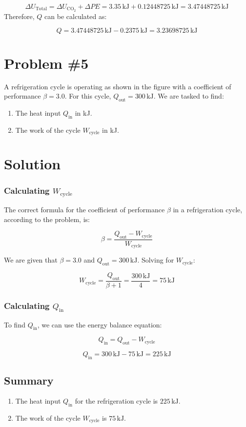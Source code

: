 \documentclass[12pt]{article}
\begin{document}
\[
\Delta U_{\text{Total}} = \Delta U_{\text{CO}_2} + \Delta PE = 3.35 \, \text{kJ} + 0.12448725 \, \text{kJ} = 3.47448725 \, \text{kJ}
\]
Therefore, \(Q\) can be calculated as:

\[
Q = 3.47448725 \, \text{kJ} - 0.2375 \, \text{kJ} = 3.23698725 \, \text{kJ}
\]
\newpage
\section*{Problem \#5}
A refrigeration cycle is operating as shown in the figure with a coefficient of performance \(\beta = 3.0\). For this cycle, \(Q_{\text{out}} = 300 \, \text{kJ}\). We are tasked to find:
\begin{enumerate}
    \item The heat input \(Q_{\text{in}}\) in kJ.
    \item The work of the cycle \(W_{\text{cycle}}\) in kJ.
\end{enumerate}

\section*{Solution}

\subsubsection*{Calculating \(W_{\text{cycle}}\)}
The correct formula for the coefficient of performance \(\beta\) in a refrigeration cycle, according to the problem, is:

\[
\beta = \frac{Q_{\text{out}} - W_{\text{cycle}}}{W_{\text{cycle}}}
\]

We are given that \(\beta = 3.0\) and \(Q_{\text{out}} = 300 \, \text{kJ}\). Solving for \(W_{\text{cycle}}\):

\[
W_{\text{cycle}} = \frac{Q_{\text{out}}}{\beta + 1} = \frac{300 \, \text{kJ}}{4} = 75 \, \text{kJ}
\]

\subsubsection*{Calculating \(Q_{\text{in}}\)}
To find \(Q_{\text{in}}\), we can use the energy balance equation:

\[
Q_{\text{in}} = Q_{\text{out}} - W_{\text{cycle}}
\]

\[
Q_{\text{in}} = 300 \, \text{kJ} - 75 \, \text{kJ} = 225 \, \text{kJ}
\]

\subsection*{Summary}
\begin{enumerate}
    \item The heat input \(Q_{\text{in}}\) for the refrigeration cycle is \(225 \, \text{kJ}\).
    \item The work of the cycle \(W_{\text{cycle}}\) is \(75 \, \text{kJ}\).
\end{enumerate}
\end{document}
